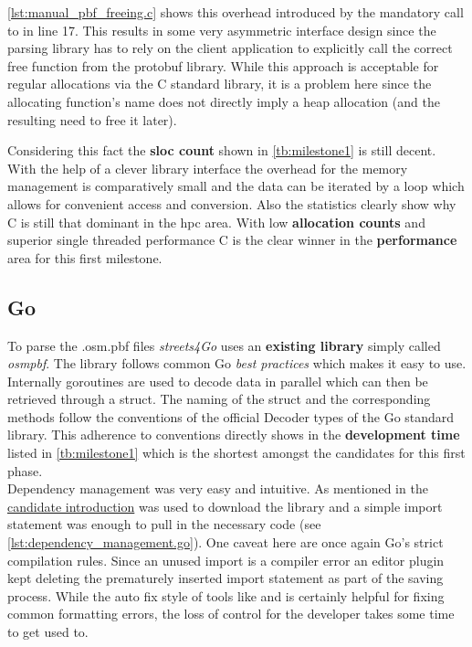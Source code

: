 \autoref{lst:manual_pbf_freeing.c} shows this overhead introduced by the mandatory call to  in line 17. This results in some very asymmetric interface design since the parsing library has to rely on the client application to explicitly call the correct free function from the \gls{protobuf} library. While this approach is acceptable for regular allocations via the C standard library, it is a problem here since the allocating function's name  does not directly imply a heap allocation (and the resulting need to free it later).

Considering this fact the \textbf{\gls{sloc} count} shown in \autoref{tb:milestone1} is still decent. With the help of a clever library interface the overhead for the memory management is comparatively small and the data can be iterated by a  loop which allows for convenient access and conversion. Also the statistics clearly show why C is still that dominant in the \gls{hpc} area. With low \textbf{allocation counts} and superior single threaded performance C is the clear winner in the \textbf{performance} area for this first milestone.

\subsection{Go}
\label{subsec:Implementation::Counting::Go}

To parse the .osm.pbf files \textit{streets4Go} uses an \textbf{existing library} simply called \textit{osmpbf}. The library follows common Go \textit{best practices} which makes it easy to use. Internally \glspl{goroutine} are used to decode data in parallel which can then be retrieved through a  struct. The naming of the struct and the corresponding methods follow the conventions of the official Decoder types of the Go standard library. This adherence to conventions directly shows in the \textbf{development time} listed in \autoref{tb:milestone1} which is the shortest amongst the candidates for this first phase.
\\


Dependency management was very easy and intuitive. As mentioned in the \hyperref[subsec:State_of_the_art::Candidates::Go]{candidate introduction}  was used to download the library and a simple import statement was enough to pull in the necessary code (see \autoref{lst:dependency_management.go}). One caveat here are once again Go's strict compilation rules. Since an unused import is a compiler error an editor plugin kept deleting the prematurely inserted import statement as part of the saving process. While the auto fix style of tools like  and  is certainly helpful for fixing common formatting errors, the loss of control for the developer takes some time to get used to.

